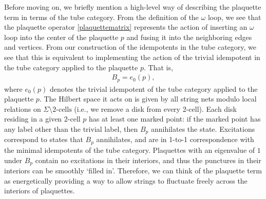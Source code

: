 Before moving on, we briefly mention a 
high-level way of describing the plaquette term in terms of the tube category.
From the definition of the $\omega$ loop, we see that the plaquette operator \eqref{plaquettematrix} 
represents the action of inserting an $\omega$ loop into the center of the plaquette $p$ and fusing it into the neighboring edges and vertices.
From our construction of the idempotents in the tube category, we see that this is 
equivalent to implementing the action of the trivial idempotent in the tube category applied to the plaquette $p$.
That is, 
\begin{align}
B_{p} = e_{0}(p),
\end{align}
where $e_{0}(p)$ denotes the trivial idempotent of the tube category 
applied
to the plaquette $p$.
The Hilbert space it acts on is given by all string nets modulo local relations on $\Sigma \setminus \text{2-cells}$ (i.e., we remove a disk from every 2-cell). 
Each disk residing in a given 2-cell $p$ has at least one marked point:
if the marked point has any label other than the trivial label, then $B_p$ annihilates the state.
Excitations correspond to states that $B_p$ annihilates, and are in 1-to-1 correspondence with the minimal idempotents of the tube category.
Plaquettes with an eigenvalue of $1$ under $B_p$ contain no 
excitations in their interiors, 
and thus the punctures in their interiors can be smoothly `filled in'. 
Therefore, we can think of the plaquette term as energetically providing a way to allow strings to 
fluctuate freely across the interiors of plaquettes. 

